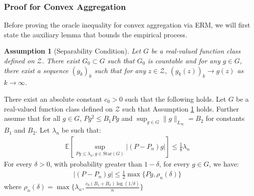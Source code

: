 \documentclass[12pt]{extarticle} %
\newcommand{\E}{\mathbb{E}}
\newtheorem{assumption}[theorem]{Assumption}
\begin{document}
\subsubsection{Proof for Convex Aggregation}
Before proving the oracle inequality for convex aggregation via ERM, we will first state the auxiliary lemma that bounds the empirical process.
\begin{assumption}[Separability Condition]\label{Separability}
Let $G$ be a real-valued function class defined on $\mathcal{Z}$. There exist $G_0\subset G$ such that $G_0$ is countable and for any $g \in G$, there exist a sequence $(g_k)_k$ such that for any $z\in \mathcal{Z}$, $(g_k(z))_k \rightarrow g(z)$ as $k \rightarrow \infty$.
\end{assumption}
\begin{lemma}\label{concentration}
    There exist an absolute constant $c_0>0$ such that the following holds. Let $G$ be a real-valued function class defined on $\mathcal{Z}$ such that Assumption \ref{Separability} holds. Further assume that for all $g\in G$, $Pg^2\leq B_1 Pg$ and $\sup_{g\in G}\|g\|_{L_\infty}= B_2$ for constants $B_1$ and $B_2$. Let $\lambda_n$ be such that:
    \begin{align*}
        \E\left[\sup_{Pg\leq\lambda_n, g\in \text{Star}(G)}|(P-P_n)g|\right]\leq \frac{1}{8}\lambda_n
    \end{align*}
    For every $\delta>0$, with probability greater than $1-\delta$, for every $g\in G$, we have:
    \begin{align*}
        |(P-P_n)g|\leq \frac{1}{2}\max\{Pg,\rho_n(\delta)\}
    \end{align*}where $\rho_n(\delta)=\max \{\lambda_n, \frac{c_0(B_1+B_2)\log(1/\delta)}{n}\}$
\end{lemma}
\end{document}
